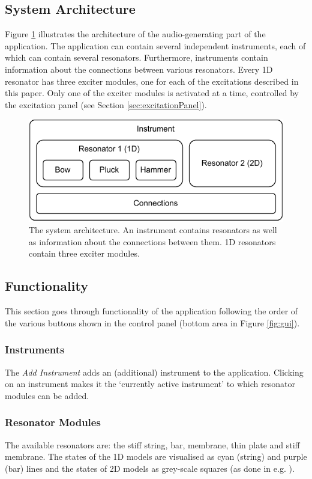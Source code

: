 \documentclass{article}
\begin{document}
\subsection{System Architecture}
Figure \ref{fig:systemArchitecture} illustrates the architecture of the audio-generating part of the application. The application can contain several independent instruments, each of which can contain several resonators. Furthermore, instruments contain information about the connections between various resonators. Every 1D resonator has three exciter modules, one for each of the excitations described in this paper. Only one of the exciter modules is activated at a time, controlled by the excitation panel (see Section \ref{sec:excitationPanel}). 
\begin{figure}[h]
    \centering
    \includegraphics[width = \columnwidth]{systemArchitectureSMC2022.pdf}
    \caption{The system architecture. An instrument contains resonators as well as information about the connections between them. 1D resonators contain three exciter modules.}
    \label{fig:systemArchitecture}
\end{figure}

\subsection{Functionality}\label{sec:controlPanel}
This section goes through functionality of the application following the order of the various buttons shown in the control panel (bottom area in Figure \ref{fig:gui}).

\subsubsection{Instruments} 
The \textit{Add Instrument} adds an (additional) instrument to the application. Clicking on an instrument makes it the `currently active instrument' to which resonator modules can be added.

\subsubsection{Resonator Modules}\label{sec:resonatorModules}
The available resonators are: the stiff string, bar, membrane, thin plate and stiff membrane. The states of the 1D models are visualised as cyan (string) and purple (bar) lines and the states of 2D models as grey-scale squares (as done in e.g. \cite{Willemsen2019, Willemsen2020}).
\end{document}
